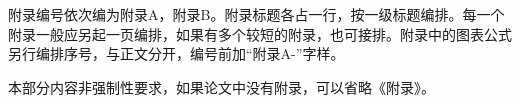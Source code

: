 附录编号依次编为附录A，附录B。附录标题各占一行，按一级标题编排。每一个附录一般应另起一页编排，如果有多个较短的附录，也可接排。附录中的图表公式另行编排序号，与正文分开，编号前加“附录A-”字样。



{
    \color{red}
    本部分内容非强制性要求，如果论文中没有附录，可以省略《附录》。
}

